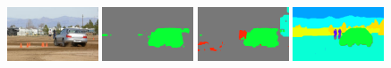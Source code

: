 \begin{figure}[tbh!]
  {\includegraphics[width=0.24\textwidth]{figures/experiments/context/image/0014.jpg}}
  {\includegraphics[width=0.24\textwidth]{figures/experiments/context/orgckpt/0014.png}}
  {\includegraphics[width=0.24\textwidth]{figures/experiments/context/nonnoisy/0014.png}}
  {\includegraphics[width=0.24\textwidth]{figures/experiments/context/gt/2008_000052.png}}
  

\end{figure}
